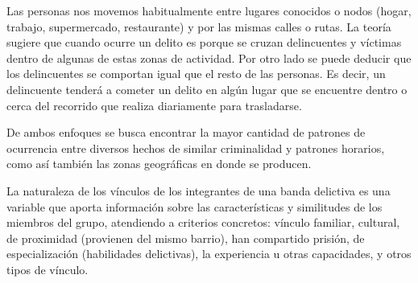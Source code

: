Las personas nos movemos habitualmente entre lugares conocidos o nodos (hogar, trabajo, supermercado, restaurante) y por las mismas calles o rutas. La teoría sugiere que cuando ocurre un delito es porque se cruzan delincuentes y víctimas dentro de algunas de estas zonas de actividad.
Por otro lado se puede deducir que los delincuentes se comportan igual que el resto de las personas. Es decir, un delincuente tenderá a cometer un delito en algún lugar que se encuentre dentro o cerca del recorrido que realiza diariamente para trasladarse.

De ambos enfoques se busca encontrar la mayor cantidad de patrones de ocurrencia entre diversos hechos de similar criminalidad y patrones horarios, como así también las zonas geográficas en donde se producen.  

La naturaleza de los vínculos de los integrantes de una banda delictiva es una variable que aporta información sobre las características y similitudes de los miembros del grupo, atendiendo a criterios concretos: vínculo familiar, cultural, de proximidad (provienen del mismo barrio), han compartido prisión, de especialización (habilidades delictivas), la experiencia u otras capacidades, y otros tipos de vínculo.
